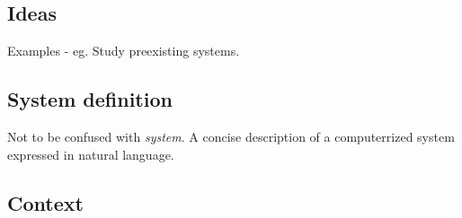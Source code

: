 \subsection*{Ideas}
Examples - eg. Study preexisting systems.

\subsection*{System definition}
Not to be confused with \textit{system}. A concise description of a computerrized system expressed in natural language.

\subsection*{Context}